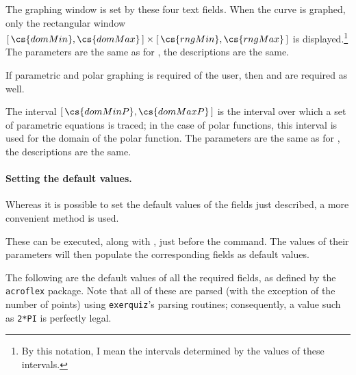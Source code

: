 \documentclass{article}
\begin{document}
\begin{dCmd}{.75\linewidth}
\end{dCmd}
\CmdDescription The graphing window is set by these four text
fields. When the curve is graphed, only the rectangular window
$[\,\cs{domMin}, \cs{domMax}\,] \times [\,\cs{rngMin},
\cs{rngMax}\,]$ is displayed.\footnote {By this notation, I mean the
intervals determined by the values of these intervals.} The
parameters are the same as for , the descriptions
are the same.

If parametric and polar graphing is required of the user, then
 and  are required as well.

\begin{dCmd}{.75\linewidth}
\end{dCmd}
\CmdDescription The interval $[\,\cs{domMinP}, \cs{domMaxP}\,]$ is
the interval over which a set of parametric equations is traced; in
the case of polar functions, this interval is used for the domain of
the polar function. The parameters are the same as for
, the descriptions are the same.

\paragraph{Setting the default values.} Whereas it is possible to
set the default values of the fields just described, a more
convenient method is used.

\begin{dCmd}{.8\linewidth}
\end{dCmd}

These can be executed, along with , just before the
 command. The values of their parameters will then
populate the corresponding fields as default values.

The following are the default values of all the required fields, as
defined by the \texttt{acroflex} package. Note that all of these are
parsed (with the exception of the number of points) using
\texttt{exerquiz}'s parsing routines; consequently, a value such as
\texttt{2*PI} is perfectly legal.
\end{document}
